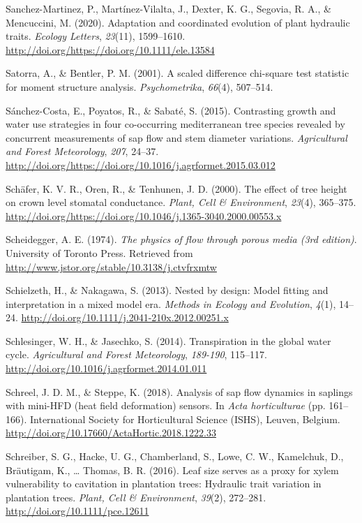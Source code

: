 \documentclass[11pt,twoside]{reedthesis}
\begin{document}
\hypertarget{ref-SanchezMartinez2020}{}
Sanchez-Martinez, P., Martínez-Vilalta, J., Dexter, K. G., Segovia, R.
A., \& Mencuccini, M. (2020). Adaptation and coordinated evolution of
plant hydraulic traits. \emph{Ecology Letters}, \emph{23}(11),
1599--1610. \url{http://doi.org/https://doi.org/10.1111/ele.13584}

\hypertarget{ref-satorra_scaled_2001}{}
Satorra, A., \& Bentler, P. M. (2001). A scaled difference chi-square
test statistic for moment structure analysis. \emph{Psychometrika},
\emph{66}(4), 507--514.

\hypertarget{ref-Sanchezcosta2015}{}
Sánchez-Costa, E., Poyatos, R., \& Sabaté, S. (2015). Contrasting growth
and water use strategies in four co-occurring mediterranean tree species
revealed by concurrent measurements of sap flow and stem diameter
variations. \emph{Agricultural and Forest Meteorology}, \emph{207},
24--37.
\url{http://doi.org/https://doi.org/10.1016/j.agrformet.2015.03.012}

\hypertarget{ref-Schafer2000}{}
Schäfer, K. V. R., Oren, R., \& Tenhunen, J. D. (2000). The effect of
tree height on crown level stomatal conductance. \emph{Plant, Cell \&
Environment}, \emph{23}(4), 365--375.
\url{http://doi.org/https://doi.org/10.1046/j.1365-3040.2000.00553.x}

\hypertarget{ref-Scheidegger1974}{}
Scheidegger, A. E. (1974). \emph{The physics of flow through porous
media (3rd edition)}. University of Toronto Press. Retrieved from
\url{http://www.jstor.org/stable/10.3138/j.ctvfrxmtw}

\hypertarget{ref-Schielzeth2013}{}
Schielzeth, H., \& Nakagawa, S. (2013). Nested by design: Model fitting
and interpretation in a mixed model era. \emph{Methods in Ecology and
Evolution}, \emph{4}(1), 14--24.
\url{http://doi.org/10.1111/j.2041-210x.2012.00251.x}

\hypertarget{ref-Schlesinger2014}{}
Schlesinger, W. H., \& Jasechko, S. (2014). Transpiration in the global
water cycle. \emph{Agricultural and Forest Meteorology}, \emph{189-190},
115--117. \url{http://doi.org/10.1016/j.agrformet.2014.01.011}

\hypertarget{ref-Schreel2018}{}
Schreel, J. D. M., \& Steppe, K. (2018). Analysis of sap flow dynamics
in saplings with mini-HFD (heat field deformation) sensors. In
\emph{Acta horticulturae} (pp. 161--166). International Society for
Horticultural Science (ISHS), Leuven, Belgium.
\url{http://doi.org/10.17660/ActaHortic.2018.1222.33}

\hypertarget{ref-schreiber_leaf_2016}{}
Schreiber, S. G., Hacke, U. G., Chamberland, S., Lowe, C. W., Kamelchuk,
D., Bräutigam, K., \ldots{} Thomas, B. R. (2016). Leaf size serves as a
proxy for xylem vulnerability to cavitation in plantation trees:
Hydraulic trait variation in plantation trees. \emph{Plant, Cell \&
Environment}, \emph{39}(2), 272--281.
\url{http://doi.org/10.1111/pce.12611}
\end{document}

